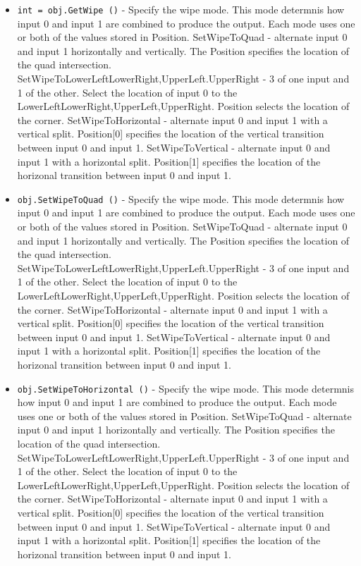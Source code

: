\begin{itemize}
\item  \verb|int = obj.GetWipe ()| -  Specify the wipe mode. This mode determnis how input 0 and input
 1 are combined to produce the output. Each mode uses one or both
 of the values stored in Position.
   SetWipeToQuad - alternate input 0 and input 1 horizontally and
     vertically. The Position specifies the location of the quad
     intersection.
   SetWipeToLowerLeft{LowerRight,UpperLeft.UpperRight} - 3 of one
     input and 1 of the other. Select the location of input 0 to the
     LowerLeft{LowerRight,UpperLeft,UpperRight}. Position
     selects the location of the corner.
   SetWipeToHorizontal - alternate input 0 and input 1 with a vertical
     split. Position[0] specifies the location of the vertical
     transition between input 0 and input 1.
   SetWipeToVertical - alternate input 0 and input 1 with a
     horizontal split. Position[1] specifies the location of the
     horizonal transition between input 0 and input 1.

\item  \verb|obj.SetWipeToQuad ()| -  Specify the wipe mode. This mode determnis how input 0 and input
 1 are combined to produce the output. Each mode uses one or both
 of the values stored in Position.
   SetWipeToQuad - alternate input 0 and input 1 horizontally and
     vertically. The Position specifies the location of the quad
     intersection.
   SetWipeToLowerLeft{LowerRight,UpperLeft.UpperRight} - 3 of one
     input and 1 of the other. Select the location of input 0 to the
     LowerLeft{LowerRight,UpperLeft,UpperRight}. Position
     selects the location of the corner.
   SetWipeToHorizontal - alternate input 0 and input 1 with a vertical
     split. Position[0] specifies the location of the vertical
     transition between input 0 and input 1.
   SetWipeToVertical - alternate input 0 and input 1 with a
     horizontal split. Position[1] specifies the location of the
     horizonal transition between input 0 and input 1.

\item  \verb|obj.SetWipeToHorizontal ()| -  Specify the wipe mode. This mode determnis how input 0 and input
 1 are combined to produce the output. Each mode uses one or both
 of the values stored in Position.
   SetWipeToQuad - alternate input 0 and input 1 horizontally and
     vertically. The Position specifies the location of the quad
     intersection.
   SetWipeToLowerLeft{LowerRight,UpperLeft.UpperRight} - 3 of one
     input and 1 of the other. Select the location of input 0 to the
     LowerLeft{LowerRight,UpperLeft,UpperRight}. Position
     selects the location of the corner.
   SetWipeToHorizontal - alternate input 0 and input 1 with a vertical
     split. Position[0] specifies the location of the vertical
     transition between input 0 and input 1.
   SetWipeToVertical - alternate input 0 and input 1 with a
     horizontal split. Position[1] specifies the location of the
     horizonal transition between input 0 and input 1.


\end{itemize}
